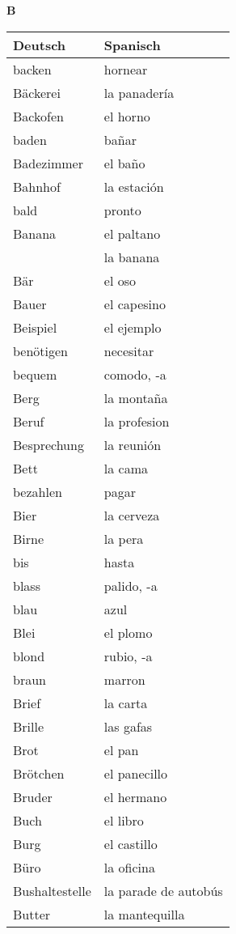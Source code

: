 \begin{flushright}\begin{Huge}\textbf{B}\end{Huge}\end{flushright}

\begin{longtable}{p{} p{}} 
\textbf{Deutsch}     & \textbf{Spanisch}                                       \\ \hline
\hline
\endhead %
backen & hornear\\
Bäckerei & la panadería\\
Backofen & el horno\\
baden & bañar\\
Badezimmer & el baño\\
Bahnhof & la estación \\
bald & pronto\\
Banana & el paltano\\
~ & la banana\\
Bär & el oso\\
Bauer & el capesino \\
Beispiel & el ejemplo \\
benötigen & necesitar\\
bequem & comodo, -a\\
Berg & la montaña \\
Beruf & la profesion\\
Besprechung & la reunión\\
Bett & la cama \\
bezahlen & pagar\\
Bier & la cerveza\\
Birne & la pera\\
bis & hasta \\
blass & palido, -a\\
blau & azul \\
Blei & el plomo \\
blond & rubio, -a\\
braun & marron \\
Brief & la carta\\
Brille & las gafas\\
Brot & el pan\\
Brötchen & el panecillo\\
Bruder & el hermano\\
Buch & el libro \\
Burg & el castillo\\
Büro & la oficina\\
Bushaltestelle & la parade de autobús\\
Butter & la mantequilla \\
\end{longtable}
